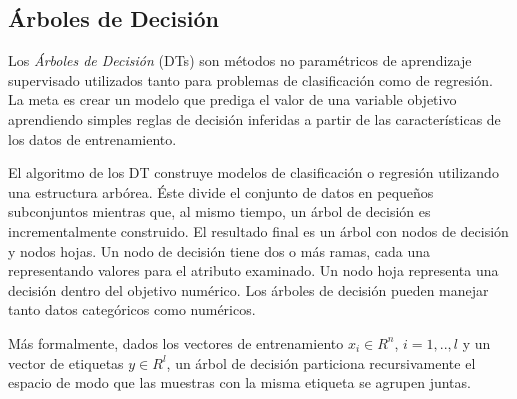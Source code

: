\subsection{Árboles de Decisión}
  \par Los \textit{Árboles de Decisión} (DTs)\cite{decision_tree_regression}
    son métodos no paramétricos de aprendizaje supervisado
    utilizados tanto para problemas de clasificación como de regresión.
    La meta es crear un modelo que prediga el valor de una variable objetivo aprendiendo
    simples reglas de decisión inferidas a partir de las características de los datos
    de entrenamiento.


  \par El algoritmo de los DT construye modelos de clasificación o regresión
    utilizando una estructura arbórea. Éste divide el conjunto de datos en pequeños
    subconjuntos mientras que, al mismo tiempo, un árbol de decisión es incrementalmente
    construido. El resultado final es un árbol con nodos de decisión y nodos hojas.
    Un nodo de decisión tiene dos o más ramas, cada una representando valores para
    el atributo examinado. Un nodo hoja representa una decisión dentro del
    objetivo numérico. Los árboles de decisión pueden manejar tanto datos
    categóricos como numéricos.


  \par Más formalmente, dados los vectores de entrenamiento $x_{i} \in R^{n}$, $i = 1,..,l$
    y un vector de etiquetas $y \in R^{l}$, un árbol de decisión particiona
    recursivamente el espacio de modo que las muestras con la misma etiqueta se agrupen juntas.


